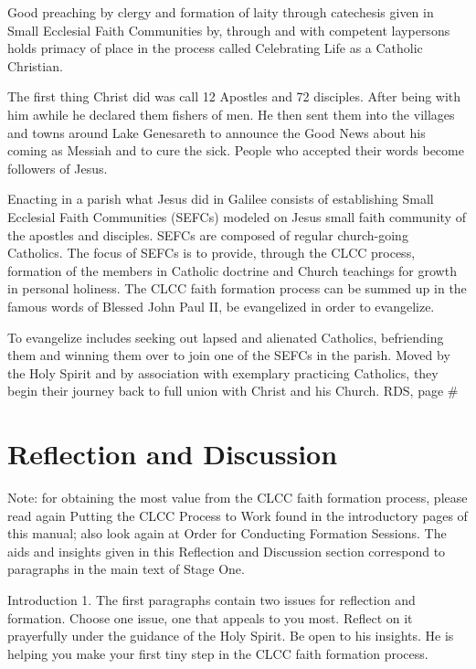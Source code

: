\documentclass[oneside]{book}
\begin{document}
Good preaching by clergy and formation of laity through catechesis given in
Small Ecclesial Faith Communities by, through and with competent laypersons
holds primacy of place in the process called Celebrating Life as a Catholic
Christian.

The first thing Christ did was call 12 Apostles and 72 disciples. After being
with him awhile he declared them fishers of men. He then sent them into the
villages and towns around Lake Genesareth to announce the Good News about his
coming as Messiah and to cure the sick. People who accepted their words become
followers of Jesus.

Enacting in a parish what Jesus did in Galilee consists of establishing Small
Ecclesial Faith Communities (SEFCs) modeled on Jesus small faith community of
the apostles and disciples. SEFCs are composed of regular church-going
Catholics. The focus of SEFCs is to provide, through the CLCC process, formation
of the members in Catholic doctrine and Church teachings for growth in personal
holiness. The CLCC faith formation process can be summed up in the famous words
of Blessed John Paul II, be evangelized in order to evangelize.

To evangelize includes seeking out lapsed and alienated Catholics, befriending
them and winning them over to join one of the SEFCs in the parish. Moved by the
Holy Spirit and by association with exemplary practicing Catholics, they begin
their journey back to full union with Christ and his Church.  RDS, page \#


\section{Reflection and Discussion}

Note: for obtaining the most value from the CLCC faith formation process, please
read again Putting the CLCC Process to Work found in the introductory pages of
this manual; also look again at Order for Conducting Formation Sessions.  The
aids and insights given in this Reflection and Discussion section correspond to
paragraphs in the main text of Stage One.


Introduction 1. The first paragraphs contain two issues for reflection and
formation. Choose one issue, one that appeals to you most. Reflect on it
prayerfully under the guidance of the Holy Spirit. Be open to his insights. He
is helping you make your first tiny step in the CLCC faith formation process.
\end{document}

